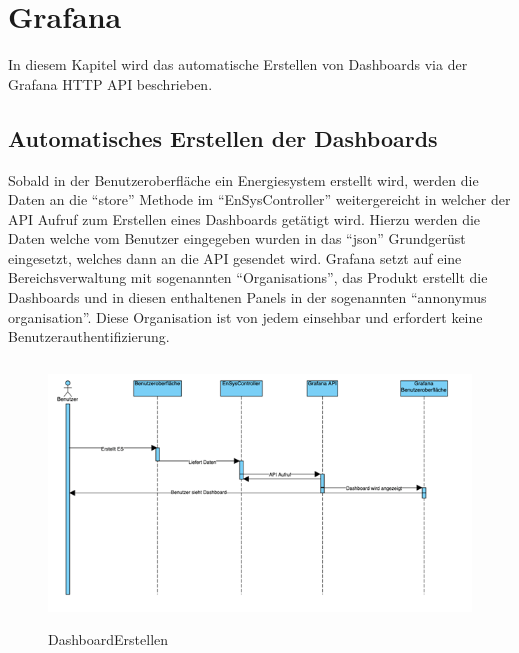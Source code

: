 \newpage
\section{Grafana}
In diesem Kapitel wird das automatische Erstellen von Dashboards via der Grafana HTTP API beschrieben. 

\subsection{Automatisches Erstellen der Dashboards}
Sobald in der Benutzeroberfläche ein Energiesystem erstellt wird, werden die Daten an die “store” Methode im “EnSysController” weitergereicht in welcher der API Aufruf zum Erstellen eines Dashboards getätigt wird. Hierzu werden die Daten welche vom Benutzer eingegeben wurden in das “json” Grundgerüst eingesetzt, welches dann an die API gesendet wird. Grafana setzt auf eine Bereichsverwaltung mit sogenannten “Organisations”, das Produkt erstellt die Dashboards und in diesen enthaltenen Panels in der sogenannten “annonymus organisation”. Diese Organisation ist von jedem einsehbar und erfordert keine Benutzerauthentifizierung. 
\begin{figure}[h]
	\centering
	\includegraphics[height=7cm,width=14cm]{images/DashboardErstellen}
	\caption{DashboardErstellen}
	\label{fig:DashboardErstellen }
\end{figure}



